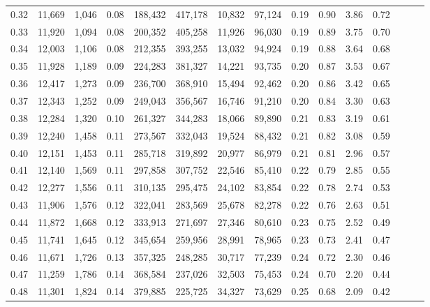 \begin{tabular}{rrrrrrrrrrrrrrr}
0.32 &  11,669 &  1,046 &  0.08 &  188,432 &  417,178 &   10,832 &   97,124 &  0.19 &  0.90 &  3.86 &      0.72 \\
0.33 &  11,920 &  1,094 &  0.08 &  200,352 &  405,258 &   11,926 &   96,030 &  0.19 &  0.89 &  3.75 &      0.70 \\
0.34 &  12,003 &  1,106 &  0.08 &  212,355 &  393,255 &   13,032 &   94,924 &  0.19 &  0.88 &  3.64 &      0.68 \\
0.35 &  11,928 &  1,189 &  0.09 &  224,283 &  381,327 &   14,221 &   93,735 &  0.20 &  0.87 &  3.53 &      0.67 \\
0.36 &  12,417 &  1,273 &  0.09 &  236,700 &  368,910 &   15,494 &   92,462 &  0.20 &  0.86 &  3.42 &      0.65 \\
0.37 &  12,343 &  1,252 &  0.09 &  249,043 &  356,567 &   16,746 &   91,210 &  0.20 &  0.84 &  3.30 &      0.63 \\
0.38 &  12,284 &  1,320 &  0.10 &  261,327 &  344,283 &   18,066 &   89,890 &  0.21 &  0.83 &  3.19 &      0.61 \\
0.39 &  12,240 &  1,458 &  0.11 &  273,567 &  332,043 &   19,524 &   88,432 &  0.21 &  0.82 &  3.08 &      0.59 \\
0.40 &  12,151 &  1,453 &  0.11 &  285,718 &  319,892 &   20,977 &   86,979 &  0.21 &  0.81 &  2.96 &      0.57 \\
0.41 &  12,140 &  1,569 &  0.11 &  297,858 &  307,752 &   22,546 &   85,410 &  0.22 &  0.79 &  2.85 &      0.55 \\
0.42 &  12,277 &  1,556 &  0.11 &  310,135 &  295,475 &   24,102 &   83,854 &  0.22 &  0.78 &  2.74 &      0.53 \\
0.43 &  11,906 &  1,576 &  0.12 &  322,041 &  283,569 &   25,678 &   82,278 &  0.22 &  0.76 &  2.63 &      0.51 \\
0.44 &  11,872 &  1,668 &  0.12 &  333,913 &  271,697 &   27,346 &   80,610 &  0.23 &  0.75 &  2.52 &      0.49 \\
0.45 &  11,741 &  1,645 &  0.12 &  345,654 &  259,956 &   28,991 &   78,965 &  0.23 &  0.73 &  2.41 &      0.47 \\
0.46 &  11,671 &  1,726 &  0.13 &  357,325 &  248,285 &   30,717 &   77,239 &  0.24 &  0.72 &  2.30 &      0.46 \\
0.47 &  11,259 &  1,786 &  0.14 &  368,584 &  237,026 &   32,503 &   75,453 &  0.24 &  0.70 &  2.20 &      0.44 \\
0.48 &  11,301 &  1,824 &  0.14 &  379,885 &  225,725 &   34,327 &   73,629 &  0.25 &  0.68 &  2.09 &      0.42 \\

\end{tabular}
